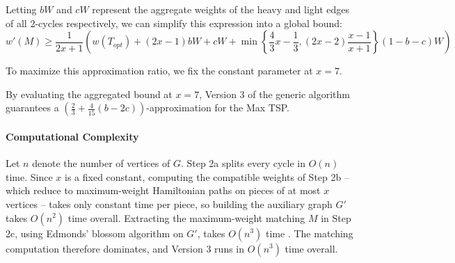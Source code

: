 Letting $bW$ and $cW$ represent the aggregate weights of the heavy and light
edges of all 2-cycles respectively, we can simplify this expression into a
global bound:
$$ w'(M) \ge \frac{1}{2x + 1} \left( w(T_{opt}) + (2x - 1)bW + cW +
\min\left\{\frac{4}{3}x - \frac{1}{3}, (2x - 2)\frac{x-1}{x+1}\right\} (1 - b -
c)W \right) $$

To maximize this approximation ratio, we fix the constant parameter at $x = 7$.

\begin{theorem} \label{lemma:version3_final}
By evaluating the aggregated bound at $x = 7$, Version 3 of the generic
algorithm guarantees a $\left(\frac{2}{3} + \frac{4}{15}(b -
2c)\right)$-approximation for the Max TSP.
\end{theorem}

\paragraph{Computational Complexity}
Let $n$ denote the number of vertices of $G$. Step 2a splits every cycle in
$O(n)$ time. Since $x$ is a fixed constant, computing the compatible weights of
Step 2b -- which reduce to maximum-weight Hamiltonian paths on pieces of at most
$x$ vertices -- takes only constant time per piece, so building the auxiliary
graph $G'$ takes $O(n^2)$ time overall. Extracting the maximum-weight matching
$M$ in Step 2c, using Edmonds' blossom algorithm on $G'$, takes $O(n^3)$ time
\cite{edmonds1965paths, edmonds1965matching}. The matching computation therefore dominates, and
Version 3 runs in $O(n^3)$ time overall.
